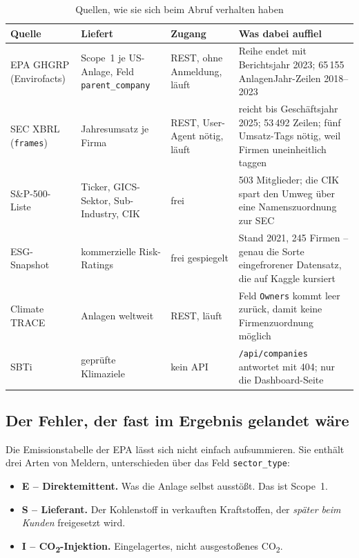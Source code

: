 \documentclass[11pt,a4paper]{article}
\begin{document}
\begin{table}[htbp]
\centering\small
\caption{Quellen, wie sie sich beim Abruf verhalten haben}
\label{tab:quellen}
\begin{tabularx}{\textwidth}{P{3.0cm} P{3.3cm} P{3.1cm} X}
\toprule
\textbf{Quelle} & \textbf{Liefert} & \textbf{Zugang} & \textbf{Was dabei auffiel} \\
\midrule
EPA GHGRP \newline (Envirofacts) & Scope~1 je US-Anlage, Feld \texttt{parent\_company} & REST, ohne Anmeldung, läuft & Reihe endet mit Berichtsjahr 2023; 65\,155 Anlagen\-Jahr-Zeilen 2018--2023 \\
SEC XBRL \newline (\texttt{frames}) & Jahresumsatz je Firma & REST, User-Agent nötig, läuft & reicht bis Geschäftsjahr 2025; 53\,492 Zeilen; fünf Umsatz-Tags nötig, weil Firmen uneinheitlich taggen \\
S\&P-500-Liste & Ticker, GICS-Sektor, Sub-Industry, CIK & frei & 503 Mitglieder; die CIK spart den Umweg über eine Namenszuordnung zur SEC \\
ESG-Snapshot & kommerzielle Risk-Ratings & frei gespiegelt & Stand 2021, 245 Firmen -- genau die Sorte eingefrorener Datensatz, die auf Kaggle kursiert \\
Climate TRACE & Anlagen weltweit & REST, läuft & Feld \texttt{Owners} kommt leer zurück, damit keine Firmenzuordnung möglich \\
SBTi & geprüfte Klimaziele & \textcolor{signal}{kein API} & \texttt{/api/companies} antwortet mit 404; nur die Dashboard-Seite \\
\bottomrule
\end{tabularx}
\end{table}

\subsection{Der Fehler, der fast im Ergebnis gelandet wäre}

Die Emissionstabelle der EPA lässt sich nicht einfach aufsummieren. Sie enthält drei Arten von Meldern, unterschieden über das Feld \texttt{sector\_type}:

\begin{itemize}
\item \textbf{E -- Direktemittent.} Was die Anlage selbst ausstößt. Das ist Scope~1.
\item \textbf{S -- Lieferant.} Der Kohlenstoff in verkauften Kraftstoffen, der \emph{später beim Kunden} freigesetzt wird.
\item \textbf{I -- CO\textsubscript{2}-Injektion.} Eingelagertes, nicht ausgestoßenes CO\textsubscript{2}.
\end{itemize}
\end{document}
